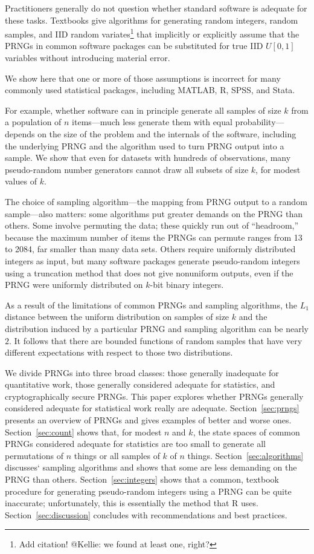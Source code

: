 \documentclass[graybox]{svmult}
\begin{document}
Practitioners generally do not question whether standard software is adequate for these tasks.
Textbooks give algorithms for generating random integers, random samples,
and IID random variates\footnote{%
Add citation! @Kellie: we found at least one, right?
} 
that implicitly or explicitly assume that the PRNGs in common software packages 
can be substituted for true IID $U[0,1]$ variables without introducing material error.

We show here that one or more of those assumptions is incorrect for many commonly used statistical packages,
including MATLAB, R, SPSS, and Stata.

For example, whether software can in principle generate all samples of size $k$ from a population of
$n$ items---much less generate them with equal probability---depends on the size of the problem and the internals of the software, including the underlying PRNG and the
algorithm used to turn PRNG output into a sample.
We show that even for datasets with hundreds of observations, 
many pseudo-random number generators
cannot draw all subsets of size $k$, for modest values of $k$.

The choice of sampling algorithm---the mapping from PRNG output to a random sample---also matters:
some algorithms put greater demands on the PRNG than others.
Some involve permuting the data; these quickly run out of ``headroom,'' because the maximum number of items the PRNGs can permute ranges from 13 to 2084, far smaller than many data sets.
Others require uniformly distributed integers as input, but many software packages generate
pseudo-random integers using a truncation method that does not give nonuniform outputs, even
if the PRNG were uniformly distributed on $k$-bit binary integers.

As a result of the limitations of common PRNGs and sampling algorithms,
the $L_1$ distance between the uniform distribution on samples of
size $k$ and the distribution induced by a particular PRNG and sampling algorithm can be nearly $2$.
It follows that there are bounded functions of random samples that have very different expectations with respect to those two distributions.

We divide PRNGs into three broad classes: those generally inadequate for quantitative work, those generally considered adequate for statistics, and cryptographically secure
PRNGs.
This paper explores whether PRNGs generally considered adequate for statistical work really are
adequate.
Section~\ref{sec:prngs} presents an overview of PRNGs and gives examples of better and worse ones.
Section~\ref{sec:count} shows that, for modest $n$ and $k$, the state spaces of common PRNGs considered adequate for statistics are too small to generate all permutations of $n$ things or all samples of $k$ of $n$ things. 
Section~\ref{sec:algorithms} discusses` sampling algorithms and shows that some are less demanding on the PRNG than others. 
Section~\ref{sec:integers} shows that a common, textbook procedure for generating pseudo-random integers using a PRNG can be quite inaccurate; unfortunately, this is essentially the method that R uses.
Section~\ref{sec:discussion} concludes with recommendations and best practices.
\end{document}
